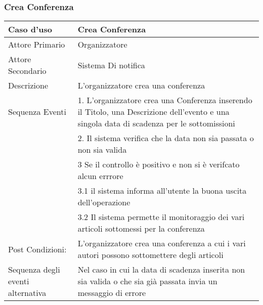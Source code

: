 \subsubsection{Crea Conferenza}
\begin{tabular}{|p{1cm}|p{10cm}}
\hline 
\rowcolor{Skyblue}
Caso d'uso & Crea Conferenza \\
\hline
Attore Primario & Organizzatore\\
\hline
Attore Secondario & Sistema Di notifica\\
\hline
Descrizione & L'organizzatore crea una conferenza \\
\hline
Sequenza Eventi&1. L'organizzatore crea una Conferenza inserendo il Titolo, una Descrizione dell'evento e una singola data di scadenza per le sottomissioni \\
& 2. Il sistema verifica che la data non sia passata o non sia valida \\ 
&3 Se il controllo è positivo e non si è verifcato alcun errrore\\
&3.1 il sistema informa all'utente la buona uscita dell'operazione\\
&3.2 Il sistema permette il monitoraggio dei vari articoli sottomessi per la conferenza\\
\hline
Post Condizioni: & L'organizzatore crea una conferenza a cui i vari autori possono sottomettere degli articoli \\
\hline
Sequenza degli eventi alternativa & Nel caso in cui la data di scadenza inserita non sia valida o che sia già passata invia un messaggio di errore \\
\hline
\end{tabular}

